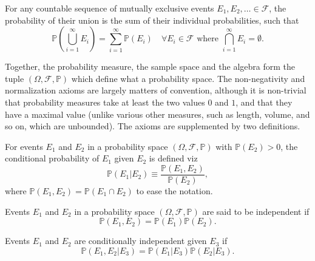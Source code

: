 \begin{axiom}[Additivity]
	\label{ax:add}
	For any countable sequence of mutually exclusive events $\mathit{E}_1, \mathit{E}_2, \ldots\in \mathcal{F}$, the probability of their union is the sum of their individual probabilities, such that
	\begin{equation}
		\mathbb{P}\left(\bigcup_{i=1}^{\infty} \mathit{E}_i\right) = \sum_{i=1}^{\infty} \mathbb{P}(\mathit{E}_i) \quad \forall \mathit{E}_i \in \mathcal{F} \text{ where } \bigcap_{i=1}^{\infty} \mathit{E}_i = \emptyset.
	\end{equation}
\end{axiom}
Together, the probability measure, the sample space and the algebra form the tuple $(\Omega, \mathcal{F}, \mathbb{P})$ which define what a probability space. The non-negativity and normalization axioms are largely matters of convention, although it is non-trivial that probability measures take at least the two values $0$ and $1$, and that they have a maximal value (unlike various other measures, such as length, volume, and so on, which are unbounded). The axioms are supplemented by two definitions.

\begin{definition}
	\label{def:conditional_probability}
	For events $E_1$ and $E_2$ in a probability space $(\Omega, \mathcal{F}, \mathbb{P})$ with $\mathbb{P}(E_2) > 0$, the conditional probability of $E_1$ given $E_2$ is defined viz
	\begin{equation}
		\mathbb{P}(E_1|E_2) \equiv \frac{\mathbb{P}(E_1, E_2)}{\mathbb{P}(E_2)},
		\label{eq:cond}
	\end{equation}
	where $\mathbb{P}(E_1,E_2)= \mathbb{P}(E_1\cap E_2)$ to ease the notation.
\end{definition}
\begin{definition}[Independence]
	\label{def:independence}
	Events $E_1$ and $E_2$  in a probability space $(\Omega, \mathcal{F}, \mathbb{P})$ are said to be independent if
	\begin{equation}
		\mathbb{P}(E_1,E_2) = \mathbb{P}(E_1) \mathbb{P}(E_2).
		\label{eq:ind}
	\end{equation}
\end{definition}

\begin{definition}
\label{def:conditional_independence}
Events $E_1$ and $E_2$ are conditionally independent given $E_3$ if
\begin{equation}
\mathbb{P}(E_1, E_2 | E_3) = \mathbb{P}(E_1|E_3)\mathbb{P}(E_2|E_3).
\end{equation}
\end{definition}


